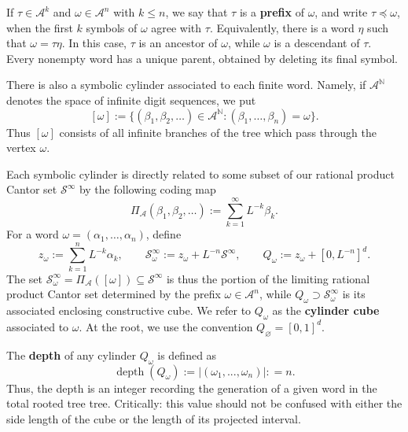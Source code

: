 \documentclass[12pt]{amsart}
\numberwithin{equation}{section}
\begin{document}
If $\tau\in\mathcal A^k$ and $\omega\in\mathcal A^n$ with $k\leq n$, we say that $\tau$ is a \textbf{prefix} of $\omega$, and write $\tau\preceq\omega$, when the first $k$ symbols of $\omega$ agree with $\tau$. Equivalently, there is a word $\eta$ such that $\omega=\tau\eta$. In this case, $\tau$ is an ancestor of $\omega$, while $\omega$ is a descendant of $\tau$. Every nonempty word has a unique parent, obtained by deleting its final symbol.

There is also a symbolic cylinder associated to each finite word. Namely, if $\mathcal A^{\mathbb N}$ denotes the space of infinite digit sequences, we put
$$
[\omega]:=\{(\beta_1,\beta_2,\ldots)\in\mathcal A^{\mathbb N}:(\beta_1,\ldots,\beta_n)=\omega\}.
$$
Thus $[\omega]$ consists of all infinite branches of the tree which pass through the vertex $\omega$.

Each symbolic cylinder is directly related to some subset of our rational product Cantor set $\mathcal{S}^{\infty}$ by the following coding map
$$
\Pi_{\mathcal A}(\beta_1,\beta_2,\ldots)
:=\sum_{k=1}^{\infty}L^{-k}\beta_k.
$$
For a word $\omega=(\alpha_1,\ldots,\alpha_n)$, define
\begin{equation}\label{eq:cylindercube}
z_\omega:=\sum_{k=1}^n L^{-k}\alpha_k,
\qquad
\mathcal S_\omega^\infty:=z_\omega+L^{-n}\mathcal S^\infty,
\qquad
Q_\omega:=z_\omega+[0,L^{-n}]^d.
\end{equation}
The set $\mathcal S_\omega^\infty=\Pi_{\mathcal A}([\omega]) \subseteq \mathcal{S}^{\infty}$ is thus the portion of the limiting rational product Cantor set determined by the prefix $\omega \in \mathcal{A}^n$, while $Q_\omega \supset \mathcal{S}_{\omega}^{\infty}$ is its associated enclosing constructive cube. We refer to $Q_\omega$ as the \textbf{cylinder cube} associated to $\omega$. At the root, we use the convention $Q_\varnothing=[0,1]^d$.

The \textbf{depth} of any cylinder $Q_\omega$ is defined as
$$
\operatorname{depth}(Q_\omega):=\lvert (\omega_1,...,\omega_n)\rvert : = n.
$$
Thus, the depth is an integer recording the generation of a given word in the total rooted tree tree. Critically: this value should not be confused with either the side length of the cube or the length of its projected interval.
\end{document}
